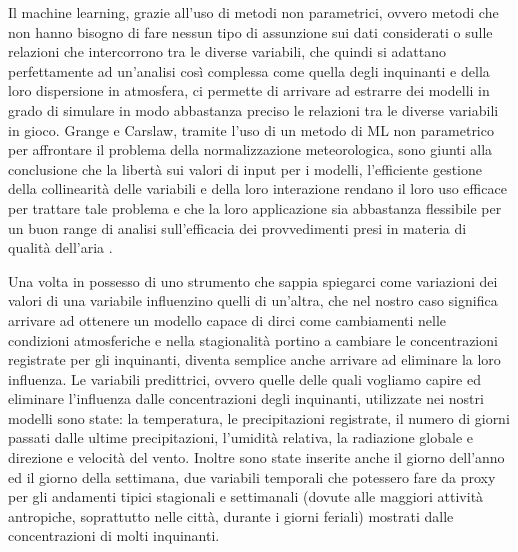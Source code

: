 \documentclass[a4paper]{report}
\begin{document}
Il machine learning, grazie all'uso di metodi non parametrici, ovvero metodi che non hanno bisogno di fare nessun tipo di assunzione sui dati considerati o sulle relazioni che intercorrono tra le diverse variabili, che quindi si adattano perfettamente ad un'analisi così complessa come quella degli inquinanti e della loro dispersione in atmosfera, ci permette di arrivare ad estrarre dei modelli in grado di simulare in modo abbastanza preciso le relazioni tra le diverse variabili in gioco.  
Grange e Carslaw, tramite l'uso di un metodo di ML non parametrico per affrontare il problema della normalizzazione meteorologica, sono giunti alla conclusione che la libertà sui valori di input per i modelli, l'efficiente gestione della collinearità delle variabili e della loro interazione rendano il loro uso efficace per trattare tale problema e che la loro applicazione sia abbastanza flessibile per un buon range di analisi sull'efficacia dei provvedimenti presi in materia di qualità dell'aria \cite{grange2019using}.

Una volta in possesso di uno strumento che sappia spiegarci come variazioni dei valori di una variabile influenzino quelli di un'altra, che nel nostro caso significa arrivare ad ottenere un modello capace di dirci come cambiamenti nelle condizioni atmosferiche e nella stagionalità portino a cambiare le concentrazioni registrate per gli inquinanti, diventa semplice anche arrivare ad eliminare la loro influenza. Le variabili predittrici, ovvero quelle delle quali vogliamo capire ed eliminare l'influenza dalle concentrazioni degli inquinanti, utilizzate nei nostri modelli sono state: la temperatura, le precipitazioni registrate, il numero di giorni passati dalle ultime precipitazioni, l'umidità relativa, la radiazione globale e direzione e velocità del vento. Inoltre sono state inserite anche il giorno dell'anno ed il giorno della settimana, due variabili temporali che potessero fare da proxy
 per gli andamenti tipici stagionali e settimanali (dovute alle maggiori attività antropiche, soprattutto nelle città, durante i giorni feriali) mostrati dalle concentrazioni di molti inquinanti. 
\end{document}
